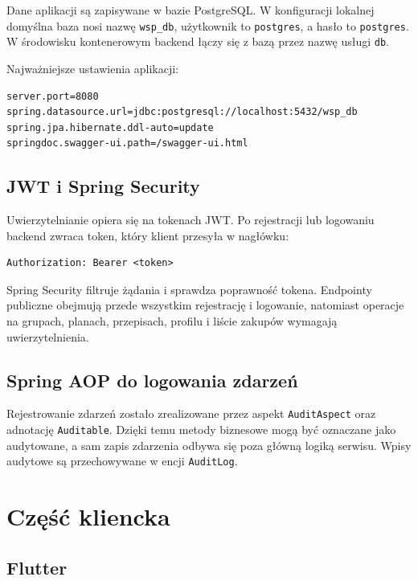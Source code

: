 \documentclass[12pt,a4paper]{article}
\begin{document}
Dane aplikacji są zapisywane w bazie PostgreSQL. W konfiguracji lokalnej domyślna baza nosi nazwę \texttt{wsp\_db}, użytkownik to \texttt{postgres}, a hasło to \texttt{postgres}. W środowisku kontenerowym backend łączy się z bazą przez nazwę usługi \texttt{db}.

Najważniejsze ustawienia aplikacji:

\begin{lstlisting}[style=terminal]
server.port=8080
spring.datasource.url=jdbc:postgresql://localhost:5432/wsp_db
spring.jpa.hibernate.ddl-auto=update
springdoc.swagger-ui.path=/swagger-ui.html
\end{lstlisting}

\subsection{JWT i Spring Security}

Uwierzytelnianie opiera się na tokenach JWT. Po rejestracji lub logowaniu backend zwraca token, który klient przesyła w nagłówku:

\begin{lstlisting}[style=terminal]
Authorization: Bearer <token>
\end{lstlisting}

Spring Security filtruje żądania i sprawdza poprawność tokena. Endpointy publiczne obejmują przede wszystkim rejestrację i logowanie, natomiast operacje na grupach, planach, przepisach, profilu i liście zakupów wymagają uwierzytelnienia.

\subsection{Spring AOP do logowania zdarzeń}

Rejestrowanie zdarzeń zostało zrealizowane przez aspekt \texttt{AuditAspect} oraz adnotację \texttt{Auditable}. Dzięki temu metody biznesowe mogą być oznaczane jako audytowane, a sam zapis zdarzenia odbywa się poza główną logiką serwisu. Wpisy audytowe są przechowywane w encji \texttt{AuditLog}.

\section{Część kliencka}

\subsection{Flutter}
\end{document}
